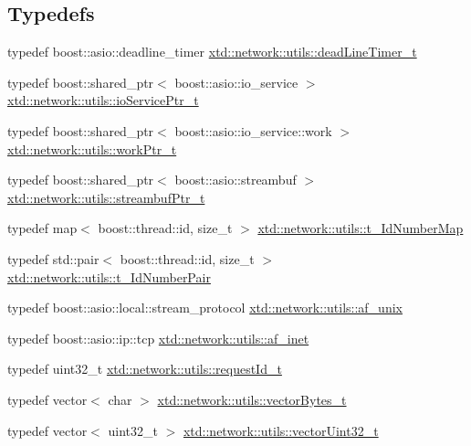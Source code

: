 \subsection*{Typedefs}
\begin{DoxyCompactItemize}
\item 
typedef boost\+::asio\+::deadline\+\_\+timer \hyperlink{namespacextd_1_1network_1_1utils_af551b4a44731a154a57b9447dac595cd}{xtd\+::network\+::utils\+::dead\+Line\+Timer\+\_\+t}
\item 
typedef boost\+::shared\+\_\+ptr$<$ boost\+::asio\+::io\+\_\+service $>$ \hyperlink{namespacextd_1_1network_1_1utils_a67dfba91438896976d636d5aea36c848}{xtd\+::network\+::utils\+::io\+Service\+Ptr\+\_\+t}
\item 
typedef boost\+::shared\+\_\+ptr$<$ boost\+::asio\+::io\+\_\+service\+::work $>$ \hyperlink{namespacextd_1_1network_1_1utils_a9e0bae7b0da2b42ca8930a927f3a7c4d}{xtd\+::network\+::utils\+::work\+Ptr\+\_\+t}
\item 
typedef boost\+::shared\+\_\+ptr$<$ boost\+::asio\+::streambuf $>$ \hyperlink{namespacextd_1_1network_1_1utils_aaaf1b50be1864a40d85efd18979631e1}{xtd\+::network\+::utils\+::streambuf\+Ptr\+\_\+t}
\item 
typedef map$<$ boost\+::thread\+::id, size\+\_\+t $>$ \hyperlink{namespacextd_1_1network_1_1utils_a778bf7884b2296561ffc1fc5a5f14e38}{xtd\+::network\+::utils\+::t\+\_\+\+Id\+Number\+Map}
\item 
typedef std\+::pair$<$ boost\+::thread\+::id, size\+\_\+t $>$ \hyperlink{namespacextd_1_1network_1_1utils_aa6bd02256b6023347de116a773dd9500}{xtd\+::network\+::utils\+::t\+\_\+\+Id\+Number\+Pair}
\item 
typedef boost\+::asio\+::local\+::stream\+\_\+protocol \hyperlink{namespacextd_1_1network_1_1utils_a60e83921a2d026f07b49fa094988acdf}{xtd\+::network\+::utils\+::af\+\_\+unix}
\item 
typedef boost\+::asio\+::ip\+::tcp \hyperlink{namespacextd_1_1network_1_1utils_a6238bab7a616eda8c9424721444a18d1}{xtd\+::network\+::utils\+::af\+\_\+inet}
\item 
typedef uint32\+\_\+t \hyperlink{namespacextd_1_1network_1_1utils_a0bdb4094852a77df867e219999175200}{xtd\+::network\+::utils\+::request\+Id\+\_\+t}
\item 
typedef vector$<$ char $>$ \hyperlink{namespacextd_1_1network_1_1utils_a9fedf0d18549b8034e9ae347955e9a9a}{xtd\+::network\+::utils\+::vector\+Bytes\+\_\+t}
\item 
typedef vector$<$ uint32\+\_\+t $>$ \hyperlink{namespacextd_1_1network_1_1utils_a2b135df55039cd8024b40ef3e1817681}{xtd\+::network\+::utils\+::vector\+Uint32\+\_\+t}

\end{DoxyCompactItemize}
